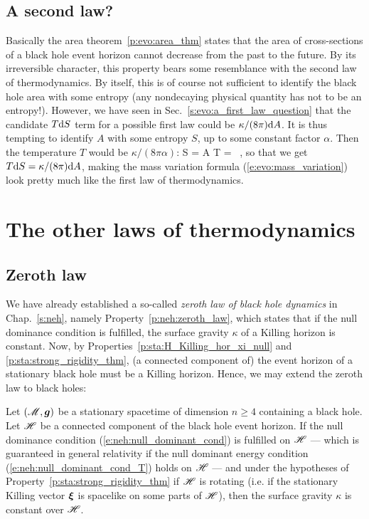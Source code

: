\subsection{A second law?}

Basically the area theorem~\ref{p:evo:area_thm} states that
the area of cross-sections of a black hole event horizon
cannot decrease from the past to the future.
By its irreversible character, this property bears some resemblance
with the second law of thermodynamics.
By itself, this is of course not sufficient to identify the black hole area
with some entropy (any nondecaying physical quantity has not to be an entropy!).
However, we have seen in Sec.~\ref{s:evo:a_first_law_question} that the
candidate $T\mathrm{d} S$ term for a possible first law could be $\kappa/(8\pi)\mathrm{d} A$.
It is thus tempting to identify $A$ with some entropy $S$, up to some
constant factor $\alpha$. Then the temperature $T$ would be $\kappa/(8\pi\alpha)$:
\be \label{e:evo:identif_S_T}
    S = \alpha A \qand T = \, \kappa ,
\ee
so that we get $T\mathrm{d} S = \kappa/(8\pi)\mathrm{d} A$, making
the mass variation formula (\ref{e:evo:mass_variation}) look pretty much like
the first law of thermodynamics.


\section{The other laws of thermodynamics}

\subsection{Zeroth law}

We have already established a so-called \emph{zeroth law of black hole dynamics}
in Chap.~\ref{s:neh}, namely Property~\ref{p:neh:zeroth_law}, which states that
if the null dominance condition is fulfilled, the surface gravity
$\kappa$ of a Killing horizon is constant. Now, by Properties~\ref{p:sta:H_Killing_hor_xi_null}
and \ref{p:sta:strong_rigidity_thm}, (a connected component of) the event horizon
of a stationary black hole must be a Killing horizon. Hence, we may extend
the zeroth law to black holes:

\begin{prop}
Let $(\mathscr{M},\bm{g})$ be a stationary spacetime of dimension $n\geq 4$ containing a black
hole. Let $\mathscr{H}$ be a connected component of the black hole event horizon.
If the null dominance condition (\ref{e:neh:null_dominant_cond})
is fulfilled on $\mathscr{H}$  --- which is guaranteed in general relativity
if the null dominant energy condition (\ref{e:neh:null_dominant_cond_T}) holds on $\mathscr{H}$ ---
and under the hypotheses of
Property~\ref{p:sta:strong_rigidity_thm} if $\mathscr{H}$ is rotating
(i.e. if the stationary Killing vector $\bm{\xi}$ is spacelike on some parts
of $\mathscr{H}$), then the surface gravity $\kappa$ is constant over $\mathscr{H}$.
\end{prop}

